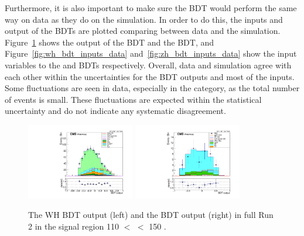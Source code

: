Furthermore, it is also important to make sure the BDT would perform the same way on data as they do on the simulation.
In order to do this, the inputs and output of the BDTs are plotted comparing between data and the simulation.
Figure~\ref{fig:vh_bdt_output_data} shows the output of the \WH BDT and the \ZH BDT, 
and Figure~\ref{fig:wh_bdt_inputs_data} and~\ref{fig:zh_bdt_inputs_data} show the input variables to the \WH and \ZH BDTs respectively.
Overall, data and simulation agree with each other within the uncertainties for the BDT outputs and most of the inputs.
Some fluctuations are seen in data, especially in the \ZH category, as the total number of events is small. 
These fluctuations are expected within the statistical uncertainty and do not indicate any systematic disagreement.

\begin{figure}[!htb]
  \centering
  \captionsetup{justification=justified}
  \includegraphics[width=0.42\textwidth]{pics/VH_sec/valid_BDT_WH/BDT_final.pdf}
  \includegraphics[width=0.42\textwidth]{pics/VH_sec/valid_BDT_ZH/BDT_final.pdf}
  \caption{The WH BDT output (left) and the \ZH BDT output (right) in full Run 2 in the signal region 110 \GeV $<$ \mmm $<$ 150 \GeV.}
  \label{fig:vh_bdt_output_data}
\end{figure}

